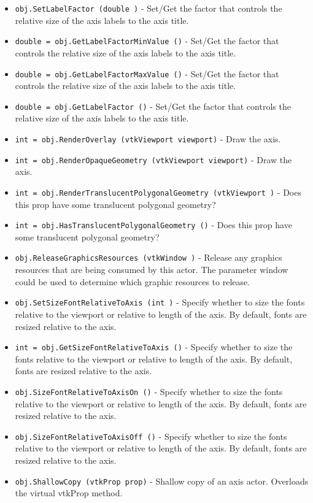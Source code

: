 \begin{itemize}
\item  \verb|obj.SetLabelFactor (double )| -  Set/Get the factor that controls the relative size of the axis labels
 to the axis title.

\item  \verb|double = obj.GetLabelFactorMinValue ()| -  Set/Get the factor that controls the relative size of the axis labels
 to the axis title.

\item  \verb|double = obj.GetLabelFactorMaxValue ()| -  Set/Get the factor that controls the relative size of the axis labels
 to the axis title.

\item  \verb|double = obj.GetLabelFactor ()| -  Set/Get the factor that controls the relative size of the axis labels
 to the axis title.

\item  \verb|int = obj.RenderOverlay (vtkViewport viewport)| -  Draw the axis. 

\item  \verb|int = obj.RenderOpaqueGeometry (vtkViewport viewport)| -  Draw the axis. 

\item  \verb|int = obj.RenderTranslucentPolygonalGeometry (vtkViewport )| -  Does this prop have some translucent polygonal geometry?

\item  \verb|int = obj.HasTranslucentPolygonalGeometry ()| -  Does this prop have some translucent polygonal geometry?

\item  \verb|obj.ReleaseGraphicsResources (vtkWindow )| -  Release any graphics resources that are being consumed by this actor.
 The parameter window could be used to determine which graphic
 resources to release.

\item  \verb|obj.SetSizeFontRelativeToAxis (int )| -  Specify whether to size the fonts relative to the viewport or relative to
 length of the axis. By default, fonts are resized relative to the axis.

\item  \verb|int = obj.GetSizeFontRelativeToAxis ()| -  Specify whether to size the fonts relative to the viewport or relative to
 length of the axis. By default, fonts are resized relative to the axis.

\item  \verb|obj.SizeFontRelativeToAxisOn ()| -  Specify whether to size the fonts relative to the viewport or relative to
 length of the axis. By default, fonts are resized relative to the axis.

\item  \verb|obj.SizeFontRelativeToAxisOff ()| -  Specify whether to size the fonts relative to the viewport or relative to
 length of the axis. By default, fonts are resized relative to the axis.

\item  \verb|obj.ShallowCopy (vtkProp prop)| -  Shallow copy of an axis actor. Overloads the virtual vtkProp method.

\end{itemize}
